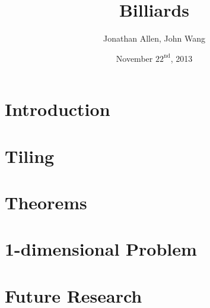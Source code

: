 \documentclass{beamer}
\title{Billiards}
\author{Jonathan Allen, John Wang}
\institute[MIT]{Massachusetts Institute of Technology}
\date{November $22^\text{nd}$, 2013}
\begin{document}
\graphicspath{ {figures/} }

\frame{

\titlepage

}

\section{Introduction}



\section{Tiling}

\frame{
  \tableofcontents[currentsection]
}



\section{Theorems}

\frame{
  \tableofcontents[currentsection]
}



\section{1-dimensional Problem}

\frame{
  \tableofcontents[currentsection]
}



\section{Future Research}

\frame{
  \tableofcontents[currentsection]
}


\end{document}

